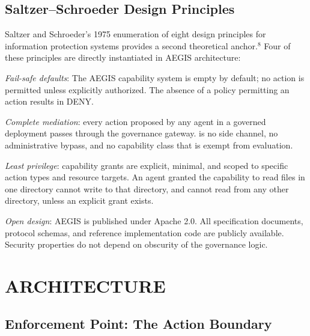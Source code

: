 \documentclass{IEEEcsmag}
\begin{document}
\subsection{Saltzer--Schroeder Design Principles}

Saltzer and Schroeder's 1975 enumeration of eight design principles for information protection systems provides a second theoretical anchor.$^{8}$ Four of these principles are directly instantiated in AEGIS architecture:

{\it Fail-safe defaults}: The AEGIS capability system is empty by default; no action is permitted unless explicitly authorized. The absence of a policy permitting an action results in DENY.

{\it Complete mediation}: every action proposed by any agent in a governed deployment passes through the governance gateway.  is no side channel, no administrative bypass, and no capability class that is exempt from evaluation. 

{\it Least privilege}: capability grants are explicit, minimal, and scoped to specific action types and resource targets. An agent granted the capability to read files in one directory cannot write to that directory, and cannot read from any other directory, unless an explicit grant exists.

{\it Open design}: AEGIS is published under Apache 2.0. All specification documents, protocol schemas, and reference implementation code are publicly available. Security properties do not depend on obscurity of the governance logic.

\section{ARCHITECTURE}

\subsection{Enforcement Point: The Action Boundary}
\end{document}
